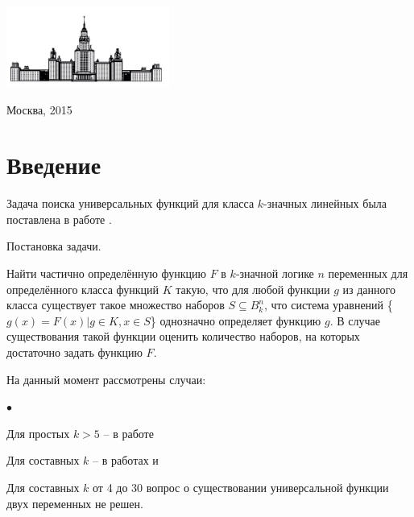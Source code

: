 \documentclass[oneside,final,14pt]{extreport}
\newenvironment{compactlist}{
    \begin{list}{{$\bullet$}}{
      \setlength\partopsep{0pt}
      \setlength\parskip{0pt}
      \setlength\parsep{0pt}
      \setlength\topsep{0pt}
      \setlength\itemsep{0pt}
} }{

 \end{list} 
}
\begin{document}
\vfill

\centerline {\includegraphics[width=0.4\textwidth]{for_kurs}}

\vfill

\begin{center}
  Москва, 2015
\end{center}

\thispagestyle{empty}

\clearpage

\tableofcontents


  \chapter*{Введение}

Задача поиска универсальных функций для класса \(k\)-значных линейных была поставлена в работе \cite{k_lin}.

Постановка задачи.

Найти частично определённую функцию \(F\) в \(k\)-значной логике \(n\) переменных 
для определённого класса функций \(K\) такую, что для любой функции \(g\) из данного класса существует такое
множество наборов \(S \subseteq B_k ^n\), что система уравнений \{\(g(x) = F(x) | g \in K, x \in S\)\} однозначно определяет
функцию \(g\). В случае существования такой функции оценить количество наборов, 
на которых достаточно задать функцию \(F\).

На данный момент рассмотрены случаи:
\begin{compactlist}
\item Для простых \(k > 5\) -- в работе \cite{k_lin} 
\item Для составных \(k\) -- в работах \cite{} и \cite{}
\end{compactlist}

Для составных \(k\) от 4 до 30 вопрос о существовании универсальной функции двух переменных не решен.

%
\end{document}
